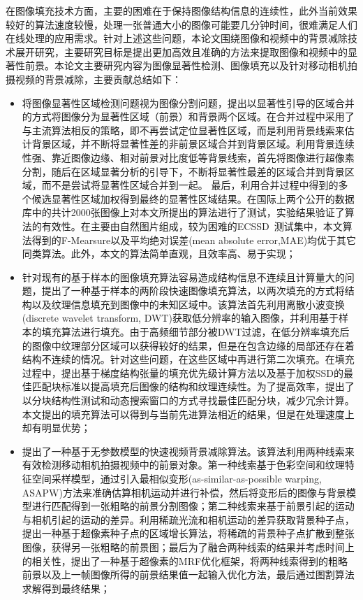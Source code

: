 \par
在图像填充技术方面，主要的困难在于保持图像结构信息的连续性，此外当前效果较好的算法速度较慢，处理一张普通大小的图像可能要几分钟时间，很难满足人们在线处理的应用需求。针对上述这些问题，本论文围绕图像和视频中的背景减除技术展开研究，主要研究目标是提出更加高效且准确的方法来提取图像和视频中的显著性前景。本论文主要研究内容为图像显著性检测、图像填充以及针对移动相机拍摄视频的背景减除，主要贡献总结如下：
 \begin{itemize}
    \item 将图像显著性区域检测问题视为图像分割问题，提出以显著性引导的区域合并的方式将图像分为显著性区域（前景）和背景两个区域。在合并过程中采用了与主流算法相反的策略，即不再尝试定位显著性区域，而是利用背景线索来估计背景区域，并不断将显著性差的非前景区域合并到背景区域。利用背景连续性强、靠近图像边缘、相对前景对比度低等背景线索，首先将图像进行超像素分割，随后在区域显著分析的引导下，不断将显著性最差的区域合并到背景区域，而不是尝试将显著性区域合并到一起。 最后，利用合并过程中得到的多个候选显著性区域加权得到最终的显著性区域结果。在国际上两个公开的数据库中的共计2000张图像上对本文所提出的算法进行了测试，实验结果验证了算法的有效性。在主要由自然图片组成，较为困难的ECSSD~\cite{ECSSD}测试集中，本文算法得到的F-Mearsure以及平均绝对误差(mean absolute error,MAE)均优于其它同类算法。此外，本文的算法简单直观，且效率高、易于实现；
    \item 针对现有的基于样本的图像填充算法容易造成结构信息不连续且计算量大的问题，提出了一种基于样本的两阶段快速图像填充算法，以两次填充的方式将结构以及纹理信息填充到图像中的未知区域中。该算法首先利用离散小波变换(discrete wavelet transform, DWT)获取低分辨率的输入图像，并利用基于样本的填充算法进行填充。由于高频细节部分被DWT过滤，在低分辨率填充后的图像中纹理部分区域可以获得较好的结果，但是在包含边缘的局部还存在着结构不连续的情况。针对这些问题，在这些区域中再进行第二次填充。在填充过程中，提出基于梯度结构张量的填充优先级计算方法以及基于加权SSD的最佳匹配块标准以提高填充后图像的结构和纹理连续性。为了提高效率，提出了以分块结构性测试和动态搜索窗口的方式寻找最佳匹配分块，减少冗余计算。本文提出的填充算法可以得到与当前先进算法相近的结果，但是在处理速度上却有明显优势；
    \item 提出了一种基于无参数模型的快速视频背景减除算法。该算法利用两种线索来有效检测移动相机拍摄视频中的前景对象。第一种线索基于色彩空间和纹理特征空间采样模型，通过引入最相似变形(as-similar-as-possible warping, ASAPW)方法来准确估算相机运动并进行补偿，然后将变形后的图像与背景模型进行匹配得到一张粗略的前景分割图像；第二种线索来基于前景引起的运动与相机引起的运动的差异。利用稀疏光流和相机运动的差异获取背景种子点，提出一种基于超像素种子点的区域增长算法，将稀疏的背景种子点扩散到整张图像，获得另一张粗略的前景图；最后为了融合两种线索的结果并考虑时间上的相关性，提出了一种基于超像素的MRF优化框架，将两种线索得到的粗略前景以及上一帧图像所得的前景结果值一起输入优化方法，最后通过图割算法求解得到最终结果；

\end{itemize}
